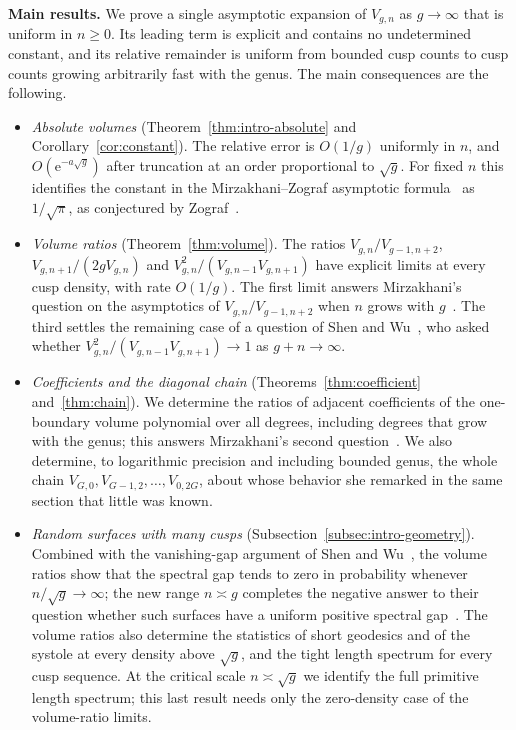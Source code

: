 \textbf{Main results.} We prove a single asymptotic expansion of $V_{g,n}$ as $g\to\infty$ that is uniform in $n\ge0$. Its leading term is explicit and contains no undetermined constant, and its relative remainder is uniform from bounded cusp counts to cusp counts growing arbitrarily fast with the genus. The main consequences are the following.
\begin{itemize}[leftmargin=*]
\item \emph{Absolute volumes} (Theorem~\ref{thm:intro-absolute} and Corollary~\ref{cor:constant}). The relative error is $O(1/g)$ uniformly in $n$, and $O(\mathrm e^{-a\sqrt g})$ after truncation at an order proportional to $\sqrt g$. For fixed $n$ this identifies the constant in the Mirzakhani--Zograf asymptotic formula~\cite[Theorem~1.2]{MZ} as $1/\sqrt\pi$, as conjectured by Zograf~\cite{Zog}.
\item \emph{Volume ratios} (Theorem~\ref{thm:volume}). The ratios $V_{g,n}/V_{g-1,n+2}$, $V_{g,n+1}/(2gV_{g,n})$ and $V_{g,n}^2/(V_{g,n-1}V_{g,n+1})$ have explicit limits at every cusp density, with rate $O(1/g)$. The first limit answers Mirzakhani's question on the asymptotics of $V_{g,n}/V_{g-1,n+2}$ when $n$ grows with $g$~\cite[Section~1.4]{Mir}. The third settles the remaining case of a question of Shen and Wu~\cite[Question~3]{SW}, who asked whether $V_{g,n}^2/(V_{g,n-1}V_{g,n+1})\to1$ as $g+n\to\infty$.
\item \emph{Coefficients and the diagonal chain} (Theorems~\ref{thm:coefficient} and~\ref{thm:chain}). We determine the ratios of adjacent coefficients of the one-boundary volume polynomial over all degrees, including degrees that grow with the genus; this answers Mirzakhani's second question~\cite[Section~1.4]{Mir}. We also determine, to logarithmic precision and including bounded genus, the whole chain $V_{G,0},V_{G-1,2},\ldots,V_{0,2G}$, about whose behavior she remarked in the same section that little was known.
\item \emph{Random surfaces with many cusps} (Subsection~\ref{subsec:intro-geometry}). Combined with the vanishing-gap argument of Shen and Wu~\cite{SW}, the volume ratios show that the spectral gap tends to zero in probability whenever $n/\sqrt g\to\infty$; the new range $n\asymp g$ completes the negative answer to their question whether such surfaces have a uniform positive spectral gap~\cite[Question~2]{SW}. The volume ratios also determine the statistics of short geodesics and of the systole at every density above $\sqrt g$, and the tight length spectrum for every cusp sequence. At the critical scale $n\asymp\sqrt g$ we identify the full primitive length spectrum; this last result needs only the zero-density case of the volume-ratio limits.
\end{itemize}

